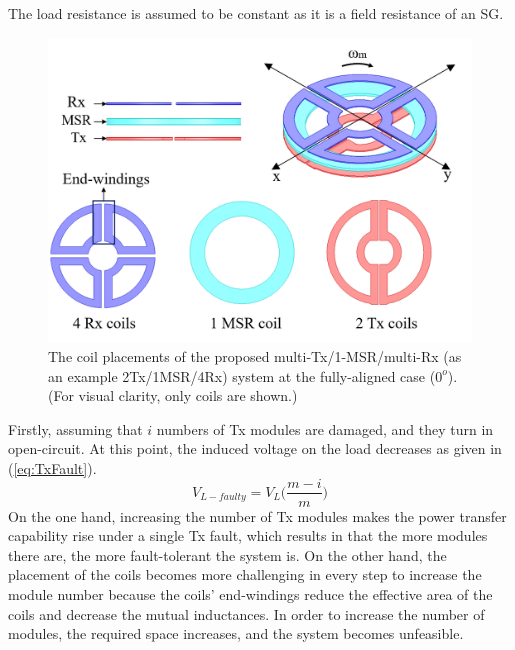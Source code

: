 \documentclass[journal]{IEEEtran}
\begin{document}
The load resistance is assumed to be constant as it is a field resistance of an SG.
\begin{figure}[h]
    \centering
    \includegraphics[width=0.9\linewidth]{rotation3.png}
    \caption{The coil placements of the proposed multi-Tx/1-MSR/multi-Rx (as an example 2Tx/1MSR/4Rx) system at the fully-aligned case ($0^o$). (For visual clarity, only coils are shown.)}
    \label{fig:rotational_coil}
\end{figure}
Firstly, assuming that $i$ numbers of Tx modules are damaged, and they turn in open-circuit. 
At this point, the induced voltage on the load decreases as given in (\ref{eq:TxFault}).
\begin{equation}
\label{eq:TxFault}
    V_{L-faulty}= V_{L}\Bigg(\frac{m-i}{m} \Bigg)
\end{equation}
On the one hand, increasing the number of Tx modules makes the power transfer capability rise under a single Tx fault, which results in that the more modules there are, the more fault-tolerant the system is. 
On the other hand, the placement of the coils becomes more challenging in every step to increase the module number because the coils' end-windings reduce the effective area of the coils and decrease the mutual inductances.
In order to increase the number of modules, the required space increases, and the system becomes unfeasible. 
\end{document}
